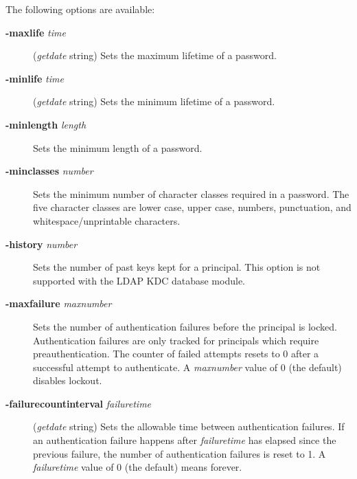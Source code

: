 \documentclass[letterpaper,10pt,english]{sphinxmanual}
\begin{document}
The following options are available:
\begin{description}
\item[{\textbf{-maxlife} \emph{time}}] \leavevmode
(\emph{getdate} string) Sets the maximum lifetime of a password.

\item[{\textbf{-minlife} \emph{time}}] \leavevmode
(\emph{getdate} string) Sets the minimum lifetime of a password.

\item[{\textbf{-minlength} \emph{length}}] \leavevmode
Sets the minimum length of a password.

\item[{\textbf{-minclasses} \emph{number}}] \leavevmode
Sets the minimum number of character classes required in a
password.  The five character classes are lower case, upper case,
numbers, punctuation, and whitespace/unprintable characters.

\item[{\textbf{-history} \emph{number}}] \leavevmode
Sets the number of past keys kept for a principal.  This option is
not supported with the LDAP KDC database module.

\end{description}
\label{admin/database:policy-maxfailure}\begin{description}
\item[{\textbf{-maxfailure} \emph{maxnumber}}] \leavevmode
Sets the number of authentication failures before the principal is
locked.  Authentication failures are only tracked for principals
which require preauthentication.  The counter of failed attempts
resets to 0 after a successful attempt to authenticate.  A
\emph{maxnumber} value of 0 (the default) disables lockout.

\end{description}
\label{admin/database:policy-failurecountinterval}\begin{description}
\item[{\textbf{-failurecountinterval} \emph{failuretime}}] \leavevmode
(\emph{getdate} string) Sets the allowable time between
authentication failures.  If an authentication failure happens
after \emph{failuretime} has elapsed since the previous failure,
the number of authentication failures is reset to 1.  A
\emph{failuretime} value of 0 (the default) means forever.

\end{description}
\end{document}
